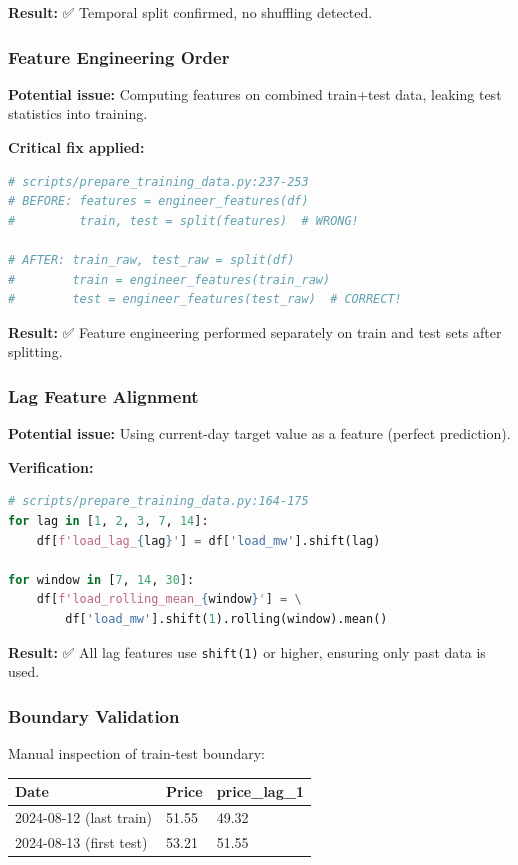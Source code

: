 \documentclass[11pt,a4paper]{article}
\begin{document}
\textbf{Result:} ✅ Temporal split confirmed, no shuffling detected.

\subsubsection{Feature Engineering Order}

\textbf{Potential issue:} Computing features on combined train+test data, leaking test statistics into training.

\textbf{Critical fix applied:}
\begin{lstlisting}[language=Python]
# scripts/prepare_training_data.py:237-253
# BEFORE: features = engineer_features(df)
#         train, test = split(features)  # WRONG!

# AFTER: train_raw, test_raw = split(df)
#        train = engineer_features(train_raw)
#        test = engineer_features(test_raw)  # CORRECT!
\end{lstlisting}

\textbf{Result:} ✅ Feature engineering performed separately on train and test sets after splitting.

\subsubsection{Lag Feature Alignment}

\textbf{Potential issue:} Using current-day target value as a feature (perfect prediction).

\textbf{Verification:}
\begin{lstlisting}[language=Python]
# scripts/prepare_training_data.py:164-175
for lag in [1, 2, 3, 7, 14]:
    df[f'load_lag_{lag}'] = df['load_mw'].shift(lag)

for window in [7, 14, 30]:
    df[f'load_rolling_mean_{window}'] = \
        df['load_mw'].shift(1).rolling(window).mean()
\end{lstlisting}

\textbf{Result:} ✅ All lag features use \texttt{shift(1)} or higher, ensuring only past data is used.

\subsubsection{Boundary Validation}

Manual inspection of train-test boundary:

\begin{table}[H]
\centering
\begin{tabular}{lll}
\toprule
\textbf{Date} & \textbf{Price} & \textbf{price\_lag\_1} \\
\midrule
2024-08-12 (last train) & 51.55 & 49.32 \\
2024-08-13 (first test) & 53.21 & 51.55 \\
\bottomrule
\end{tabular}
\end{table}
\end{document}
